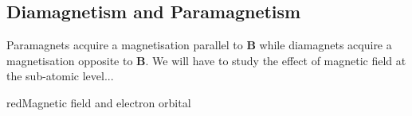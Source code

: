 \documentclass[12pt,a4paper]{extreport}
\numberwithin{equation}{chapter}
\begin{document}
    \subsection{Diamagnetism and Paramagnetism}
    Paramagnets acquire a magnetisation parallel to $\mathbf{B}$ while diamagnets acquire a magnetisation opposite to $\mathbf{B}$. We will have to study the effect of magnetic field at the sub-atomic level... 

    \begin{mybox}{red}{Magnetic field and electron orbital}
        \begin{center}

            \begin{tikzpicture}[x=0.75pt,y=0.75pt,yscale=-1,xscale=1]


\end{tikzpicture}
\end{center}
\end{mybox}
\end{document}
